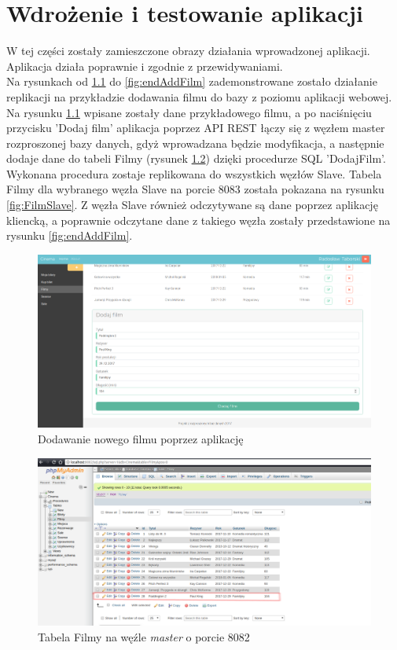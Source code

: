 \chapter{Wdrożenie i testowanie aplikacji}

W tej części zostały zamieszczone obrazy działania wprowadzonej aplikacji. Aplikacja działa
poprawnie i zgodnie z przewidywaniami. \\

Na rysunkach od \ref{fig:addFilm} do \ref{fig:endAddFilm} zademonstrowane zostało działanie replikacji na przykładzie dodawania filmu do bazy z poziomu aplikacji webowej.\\

Na rysunku \ref{fig:addFilm} wpisane zostały dane przykładowego filmu, a po naciśnięciu przycisku 'Dodaj film' aplikacja poprzez API REST łączy się z węzłem master rozproszonej bazy danych, gdyż wprowadzana będzie modyfikacja, a następnie dodaje dane do tabeli Filmy (rysunek \ref{fig:FilmMaster}) dzięki procedurze SQL 'DodajFilm'. Wykonana procedura zostaje replikowana do wszystkich węzłów Slave. Tabela Filmy dla wybranego węzła Slave na porcie 8083 została pokazana na rysunku \ref{fig:FilmSlave}. Z węzła Slave również odczytywane są dane poprzez aplikację kliencką, a poprawnie odczytane dane z takiego węzła zostały przedstawione na rysunku \ref{fig:endAddFilm}.

\begin{figure} [H]
	\centering
	\includegraphics[width=1\linewidth]{rozdzial06/5.png}
	\caption{Dodawanie nowego filmu poprzez aplikację}
	\label{fig:addFilm}
\end{figure}

\begin{figure} [H]
	\centering
	\includegraphics[width=1\linewidth]{rozdzial06/7.png}
	\caption{Tabela Filmy na węźle \textit{master} o porcie 8082}
	\label{fig:FilmMaster}
\end{figure}


